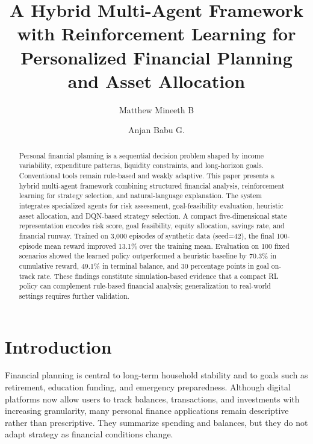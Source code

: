 \documentclass{svproc}
\begin{document}
\mainmatter 
\title{A Hybrid Multi-Agent Framework with Reinforcement Learning for Personalized Financial Planning and Asset Allocation}

\author{Matthew Mineeth B \and Anjan Babu G.}

\maketitle

\begin{abstract}
Personal financial planning is a sequential decision problem shaped by income variability, expenditure patterns, liquidity constraints, and long-horizon goals. Conventional tools remain rule-based and weakly adaptive. This paper presents a hybrid multi-agent framework combining structured financial analysis, reinforcement learning for strategy selection, and natural-language explanation. The system integrates specialized agents for risk assessment, goal-feasibility evaluation, heuristic asset allocation, and DQN-based strategy selection. A compact five-dimensional state representation encodes risk score, goal feasibility, equity allocation, savings rate, and financial runway. Trained on 3,000 episodes of synthetic data (seed=42), the final 100-episode mean reward improved 13.1\% over the training mean. Evaluation on 100 fixed scenarios showed the learned policy outperformed a heuristic baseline by 70.3\% in cumulative reward, 49.1\% in terminal balance, and 30 percentage points in goal on-track rate. These findings constitute simulation-based evidence that a compact RL policy can complement rule-based financial analysis; generalization to real-world settings requires further validation.
\end{abstract}
%
\section{Introduction}
%
Financial planning is central to long-term household stability and to goals such as retirement, education funding, and emergency preparedness. Although digital platforms now allow users to track balances, transactions, and investments with increasing granularity, many personal finance applications remain descriptive rather than prescriptive. They summarize spending and balances, but they do not adapt strategy as financial conditions change.
\end{document}

